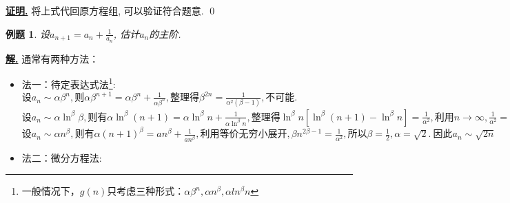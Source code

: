 \documentclass[10pt,a4paper]{book}
\theoremstyle{thmstyle} %
\theoremstyle{defstyle} %
\theoremstyle{prostyle} %
\newtheorem{example}[theorem]{例题}
\renewenvironment{proof}[1][证明]{\par{\kaishu \uline{\textbf{#1.}}} \;\fangsong}{\qed\par}
\newenvironment{solution}{\par\underline{\textbf{解.}} \;\kaishu}{\par}
\begin{document}
	\begin{proof}
		将上式代回原方程组, 可以验证符合题意. 
	\end{proof}
	\begin{example}
		设$a_{n+1}=a_n+\frac{1}{a_n}$, 估计$a_n$的主阶.
	\end{example}
	\begin{solution}
		通常有两种方法：
		\begin{itemize}
			\item 法一：待定表达式法\footnote{一般情况下，$g(n)$只考虑三种形式：$\alpha\beta^n, \alpha n^\beta, \alpha ln^\beta n$}: \\
			$
			\text{设}a_n\sim \alpha \beta ^n, \text{则}\alpha \beta ^{n+1}=\alpha \beta ^n+\frac{1}{\alpha \beta ^n}, \text{整理得}\beta ^{2n}=\frac{1}{\alpha ^2\left( \beta -1 \right)}, \text{不可能}. 
			$
			\\
			$
			\text{设}a_n\sim \alpha \ln ^{\beta}\beta , \text{则有}\alpha \ln ^{\beta}\left( n+1 \right) =\alpha \ln ^{\beta}n+\frac{1}{\alpha \ln ^{\beta}n}, \text{整理得}\ln ^{\beta}n\left[ \ln ^{\beta}\left( n+1 \right) -\ln ^{\beta}n \right] =\frac{1}{\alpha ^2}, \text{利用}n\rightarrow\infty , \frac{1}{\alpha ^2}=\ln ^{\beta}n\ln ^{\beta}\left( 1+\frac{1}{n} \right) =\left( \frac{\ln n}{n} \right) ^{\beta}\rightarrow 0, \text{不可能}. 
			$\\
			$
			\text{设}a_n\sim \alpha n^{\beta}, \text{则有}\alpha \left( n+1 \right) ^{\beta}=an^{\beta}+\frac{1}{an^{\beta}}, \text{利用等价无穷小展开}, \beta n^{2\beta -1}=\frac{1}{\alpha ^2}, \text{所以}\beta =\frac{1}{2}, \alpha =\sqrt{2}.\ \text{因此}a_n\sim \sqrt{2n}
			$
			
			
			\item 法二：微分方程法:\\
			
			
		\end{itemize}
	\end{solution}
	
	
	
	
\end{document}
